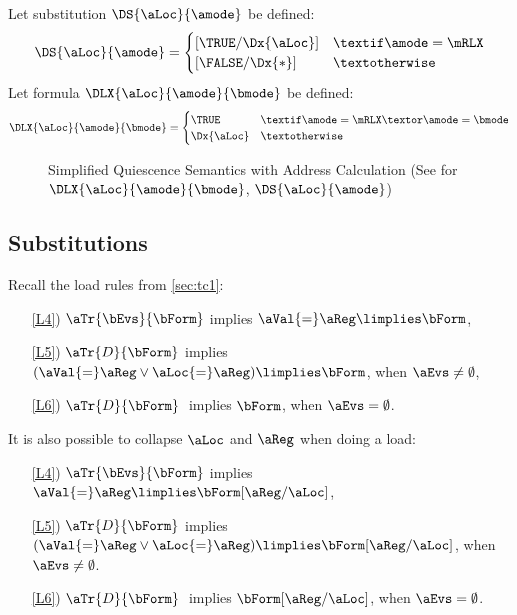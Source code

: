 \begin{scope}
\begin{definition}
    \noindent
    Let substitution $\DS{\aLoc}{\amode}$ be defined:
    \begin{displaymath}
      \DS{\aLoc}{\amode}=
      \begin{cases}
        [\TRUE/\Dx{\aLoc}] & \textif \amode=\mRLX
        \\
        [\FALSE/\Dx{*}] & \textotherwise
      \end{cases}
    \end{displaymath}
    Let formula $\DLX{\aLoc}{\amode}{\bmode}$ be defined:
    \begin{displaymath}
      \DLX{\aLoc}{\amode}{\bmode}=
      \begin{cases}
        \TRUE & \textif \amode=\mRLX \textor \amode=\bmode
        \\
        \Dx{\aLoc} & \textotherwise
      \end{cases}
    \end{displaymath}
  \end{definition}
\end{scope}

\begin{figure*}
  \showRAtrue
  \begin{center}
    \begin{minipage}{.91\textwidth}
      
    \end{minipage}
  \end{center}
  \caption{Simplified Quiescence Semantics with Address Calculation
    (See %
     for $\DLX{\aLoc}{\amode}{\bmode}$, $\DS{\aLoc}{\amode}$)
  } 
  \label{fig:no-q}
\end{figure*}    


\subsection{Substitutions}
\label{sec:substitutions}

Recall the load rules from \textsection\ref{sec:tc1}: %
\begin{enumerate}
\item[\ref{L4})]
  $\aTr{\bEvs}{\bForm}$ implies $\aVal{=}\aReg\limplies\bForm$, 
\item[\ref{L5})]
  $\aTr{\cEvs}{\bForm}$ implies
  $(\aVal{=}\aReg\lor\aLoc{=}\aReg)\limplies\bForm$, when $\aEvs\neq\emptyset$,
\item[\ref{L6})] 
  $\aTr{\dEvs}{\bForm}\;$ implies $\bForm$, when $\aEvs=\emptyset$.
\end{enumerate}
It is also possible to collapse $\aLoc$ and $\aReg$ when doing a load:
\begin{enumerate}
\item[\ref{L4})]
  $\aTr{\bEvs}{\bForm}$ implies $\aVal{=}\aReg\limplies\bForm[\aReg/\aLoc]$, 
\item[\ref{L5})]
  $\aTr{\cEvs}{\bForm}$ implies
  $(\aVal{=}\aReg\lor\aLoc{=}\aReg)\limplies\bForm[\aReg/\aLoc]$, when $\aEvs\neq\emptyset$.
\item[\ref{L6})] 
  $\aTr{\dEvs}{\bForm}\;$ implies $\bForm[\aReg/\aLoc]$, when $\aEvs=\emptyset$.
\end{enumerate}

